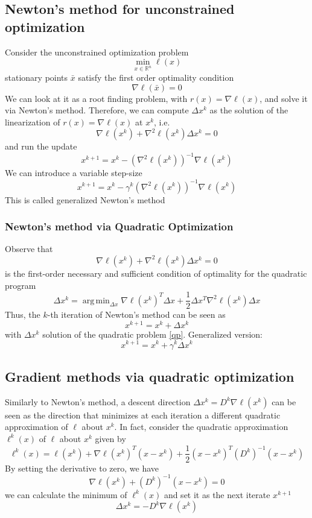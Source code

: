 \documentclass[openany]{book}
\DeclareMathOperator*{\argmin}{arg\,min} %
\newcommand{\R}{\mathbb{R}} %
\theoremstyle{definition}
\theoremstyle{remark}
\begin{document}
\subsection{Newton's method for unconstrained optimization}
Consider the unconstrained optimization problem 
\[
    \min_{x\in\R^n} \ell(x)
\]
stationary points $\bar{x}$ satisfy the first order optimality condition 
\[
    \nabla \ell (\bar{x}) = 0
\]
We can look at it as a root finding problem, with $r(x)=\nabla\ell(x)$, and solve it via Newton's method. Therefore, we can compute $\Delta x^k$ as the solution of the linearization of $r(x)=\nabla\ell(x)$ at $x^k$, i.e. 
\[
    \nabla \ell(x^k) + \nabla^2\ell(x^k)\Delta x^k = 0
\]
and run the update 
\[
    x^{k+1} = x^k -(\nabla^2\ell(x^k))^{-1}\nabla\ell(x^k)
\]
We can introduce a variable step-size 
\[
    x^{k+1} = x^k-\gamma^k(\nabla^2\ell(x^k))^{-1}\nabla\ell(x^k)
\]
This is called generalized Newton's method
\subsubsection{Newton's method via Quadratic Optimization}
Observe that 
\[
    \nabla\ell(x^k) +\nabla^2\ell(x^k)\Delta x^k = 0
\]
is the first-order necessary and sufficient condition of optimality for the quadratic program 
\begin{equation}
    \label{qp}
    \Delta x^k = \argmin_{\Delta x}\nabla\ell(x^k)^T \Delta x+\displaystyle\frac{1}{2}\Delta x^T\nabla^2\ell(x^k)\Delta x
\end{equation}
Thus, the $k$-th iteration of Newton's method can be seen as 
\[
    x^{k+1} = x^k+\Delta x^k
\]
with $\Delta x^k$ solution of the quadratic problem \eqref{qp}. Generalized version: 
\[
    x^{k+1} = x^k + \gamma^k \Delta x^k
\]

\subsection{Gradient methods via quadratic optimization}
Similarly to Newton's method, a descent direction $\Delta x^k=D^k\nabla\ell(x^k)$ can be seen as the direction that minimizes at each iteration a different quadratic approximation of $\ell$ about $x^k$. In fact, consider the quadratic approximation $\ell^k(x)$ of $ \ell$ about $x^k$ given by 
\[
    \ell^k(x) = \ell(x^k)+\nabla\ell(x^k)^T(x-x^k)+\displaystyle\frac{1}{2}(x-x^k)^T(D^k)^{-1}(x-x^k)
\]
By setting the derivative to zero, we have 
\[
    \nabla\ell(x^k)+(D^k)^{-1}(x-x^k)=0
\]
we can calculate the minimum of $\ell^k(x)$ and set it as the next iterate $x^{k+1}$
\[
    \Delta x^k = -D^k\nabla\ell(x^k)
\]
\end{document}
